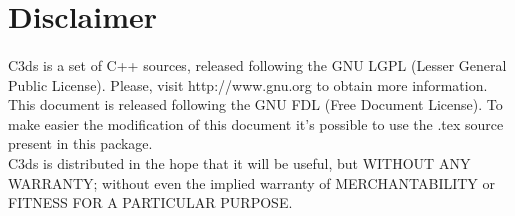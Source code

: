 \documentclass[11pt,a4paper]{article}
\begin{document}
\section*{Disclaimer}

\paragraph*{}
C3ds is a set of C++ sources, released following the GNU LGPL (Lesser General Public License). Please, visit http://www.gnu.org to obtain more information.\\
This document is released following the GNU FDL (Free Document License). To make easier the modification of this document it's possible to use the .tex source present in this package.\\
C3ds is distributed in the hope that it will be useful, but WITHOUT ANY WARRANTY; without even the implied warranty of MERCHANTABILITY or FITNESS FOR A PARTICULAR PURPOSE.
\end{document}
